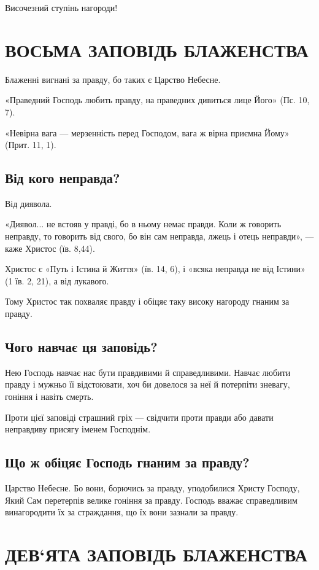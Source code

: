 \documentclass[main.tex]{subfiles}
\begin{document}
Височезний ступінь нагороди!

\section{ВОСЬМА ЗАПОВІДЬ БЛАЖЕНСТВА}

Блаженні вигнані за правду, бо таких є Царство Небесне.

«Праведний Господь любить правду, на праведних дивиться лице Його» (Пс. 10, 7).

«Невірна вага — мерзенність перед Господом, вага ж вірна приємна Йому» (Прит. 11, 1).

\subsection{Від кого неправда?}

Від диявола.

«Диявол... не встояв у правді, бо в ньому немає правди. Коли ж говорить неправду, то говорить від свого, бо він сам неправда, лжець і отець неправди», — каже Христос (їв. 8,44).

Христос є «Путь і Істина й Життя» (їв. 14, 6), і «всяка неправда не від Істини» (1 їв. 2, 21), а від лукавого.

Тому Христос так похваляє правду і обіцяє таку високу нагороду гнаним за правду.

\subsection{Чого навчає ця заповідь?}

Нею Господь навчає нас бути правдивими й справедливими. Навчає любити правду і мужньо її відстоювати, хоч би довелося за неї й потерпіти зневагу, гоніння і навіть смерть.

Проти цієї заповіді страшний гріх — свідчити проти правди або давати неправдиву присягу іменем Господнім.

\subsection{Що ж обіцяє Господь гнаним за правду?}

Царство Небесне. Бо вони, борючись за правду, уподобилися Христу Господу, Який Сам перетерпів велике гоніння за правду. Господь вважає справедливим винагородити їх за страждання, що їх вони зазнали за правду.

\section{ДЕВ`ЯТА ЗАПОВІДЬ БЛАЖЕНСТВА}
\end{document}
